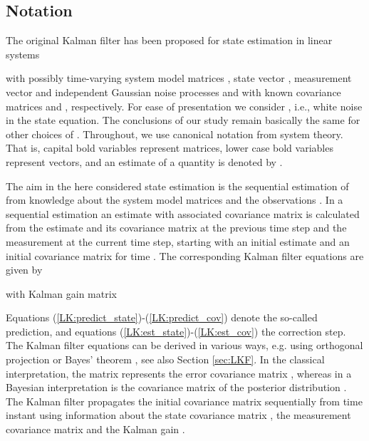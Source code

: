 \documentclass[10pt]{article}
\begin{document}
\begin{spacing}{1}
\section{Notation}
\label{sec:Notation}
The original Kalman filter \cite{Kalman} has been proposed for state estimation in linear systems

with possibly time-varying system model matrices , state vector , measurement vector  and independent Gaussian noise processes  and  with known covariance matrices  and , respectively. For ease of presentation we consider , i.e., white noise in the state equation. The conclusions of our study remain basically the same for other choices of . Throughout, we use canonical notation from system theory. That is, capital bold variables represent matrices, lower case bold variables represent vectors, and an estimate of a quantity  is denoted by .

The aim in the here considered state estimation is the sequential estimation of  from knowledge about the system model matrices and the observations . In a sequential estimation an estimate  with associated covariance matrix  is calculated from the estimate and its covariance matrix at the previous time step  and the measurement  at the current time step, starting with an initial estimate and an initial covariance matrix for time . The corresponding Kalman filter equations are given by \cite{Kalman}

with Kalman gain matrix

Equations (\ref{LK:predict_state})-(\ref{LK:predict_cov}) denote the so-called prediction, and equations (\ref{LK:est_state})-(\ref{LK:est_cov}) the correction step. The Kalman filter equations can be derived in various ways, e.g. using orthogonal projection \cite{Kalman} or Bayes' theorem \cite{Candy}, see also Section \ref{sec:LKF}. In the classical interpretation, the matrix  represents the error covariance matrix , whereas in a Bayesian interpretation  is the covariance matrix of the posterior distribution  \cite{Candy}. 
The Kalman filter propagates the initial covariance matrix  sequentially from time instant  using information about the state covariance matrix , the measurement covariance matrix  and the Kalman gain . 


\end{spacing}
\end{document}
